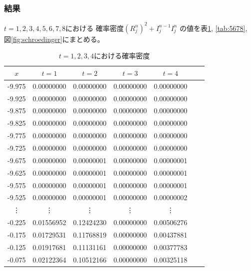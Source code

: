 \documentclass[a4j, titlepage]{jsarticle}
\numberwithin{equation}{section}
\begin{document}
        \subsubsection{結果}
            $t=1,2,3,4,5,6,7,8$における
            確率密度$\left(R_j^n\right)^2 + I_j^{n - 1}I_j^n$
            の値を表\ref{tab:1234}, \ref{tab:5678}, 図\ref{fig:schroedinger}にまとめる。
            \begin{table}[h]
                \caption{$t=1,2,3,4$における確率密度}
                \label{tab:1234}
                \centering
                \begin{tabular}{ccccccc}
                    \hline
                    $x$ & $t = 1$ & $t = 2$ & $t = 3$ & $t = 4$
                    \\
                    \hline
                    \hline
                    -9.975 & 0.00000000 & 0.00000000 & 0.00000000 & 0.00000000 \\
                    -9.925 & 0.00000000 & 0.00000000 & 0.00000000 & 0.00000000 \\
                    -9.875 & 0.00000000 & 0.00000000 & 0.00000000 & 0.00000000 \\
                    -9.825 & 0.00000000 & 0.00000000 & 0.00000000 & 0.00000000 \\
                    -9.775 & 0.00000000 & 0.00000000 & 0.00000000 & 0.00000000 \\
                    -9.725 & 0.00000000 & 0.00000000 & 0.00000000 & 0.00000000 \\
                    -9.675 & 0.00000000 & 0.00000001 & 0.00000000 & 0.00000001 \\
                    -9.625 & 0.00000000 & 0.00000001 & 0.00000000 & 0.00000001 \\
                    -9.575 & 0.00000000 & 0.00000001 & 0.00000000 & 0.00000001 \\
                    -9.525 & 0.00000000 & 0.00000001 & 0.00000000 & 0.00000002 \\
                    \vdots & \vdots & \vdots & \vdots & \vdots \vspace{1mm} \\
                    -0.225 & 0.01556952 & 0.12424230 & 0.00000000 & 0.00506276 \\
                    -0.175 & 0.01729531 & 0.11768819 & 0.00000000 & 0.00437881 \\
                    -0.125 & 0.01917681 & 0.11131161 & 0.00000000 & 0.00377783 \\
                    -0.075 & 0.02122364 & 0.10512166 & 0.00000000 & 0.00325118 \\

\end{tabular}
\end{table}
\end{document}
